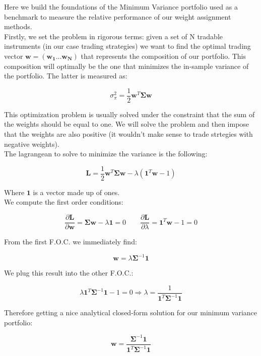 Here we build the foundations of the Minimum Variance portfolio used as a benchmark to measure the relative performance of our weight assignment methods.\\
Firstly, we set the problem in rigorous terms: given a set of N tradable instruments (in our case trading strategies) we want to find the optimal trading vector $\mathbf{w} = (\mathbf{w_1} \dots \mathbf{w_N})$ that represents the composition of our portfolio. This composition will optimally be the one that minimizes the in-sample variance of the portfolio. The latter is measured as:

$$
\sigma^2_\pi = \frac{1}{2} \mathbf{w}^T\mathbf{\Sigma} \mathbf{w}
$$

This optimization problem is usually solved under the constraint that the sum of the weights should be equal to one. We will solve the problem and then impose that the weights are also positive (it wouldn't make sense to trade strtegies with negative weights).\\
The lagrangean to solve to minimize the variance is the following:

$$
\mathbf{L} = \frac{1}{2} \mathbf{w}^T\mathbf{\Sigma} \mathbf{w} - \lambda\left(\mathbf{1}^T\mathbf{w} - 1\right)
$$

Where $\mathbf{1}$ is a vector made up of ones.\\
We compute the first order conditions:

$$
\frac{\partial \mathbf{L}}{\partial \mathbf{w}} = \mathbf{\Sigma} \mathbf{w} - \lambda\mathbf{1} = 0 \qquad  \frac{\partial \mathbf{L}}{\partial \lambda} = \mathbf{1}^T\mathbf{w} - 1 = 0
$$

From the first F.O.C. we immediately find:

$$
\mathbf{w} = \lambda \mathbf{\Sigma}^{-1} \mathbf{1}
$$

We plug this result into the other F.O.C.:

$$
\lambda \mathbf{1}^T \mathbf{\Sigma}^{-1} \mathbf{1} - 1 = 0 \Longrightarrow \lambda = \frac{1}{\mathbf{1}^T \mathbf{\Sigma}^{-1} \mathbf{1}}
$$

Therefore getting a nice analytical closed-form solution for our minimum variance portfolio:

$$
\mathbf{w} = \frac{\mathbf{\Sigma}^{-1} \mathbf{1}}{\mathbf{1}^T \mathbf{\Sigma}^{-1} \mathbf{1}}
$$

